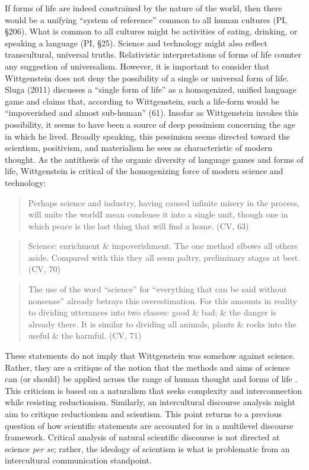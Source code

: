 If forms of life are indeed constrained by the nature of the world, then there would be a unifying ``system of reference'' common to all human cultures (PI, \S 206). What is common to all cultures might be activities of eating, drinking, or speaking a language (PI, \S 25). Science and technology might also reflect transcultural, universal truths. Relativistic interpretations of forms of life counter any suggestion of universalism. However, it is important to consider that Wittgenstein does not deny the possibility of a single or universal form of life. Sluga (2011) discusses a ``single form of life'' as a homogenized, unified language game and claims that, according to Wittgenstein, such a life-form would be ``impoverished and almost sub-human'' (61). Insofar as Wittgenstein invokes this possibility, it seems to have been a source of deep pessimism concerning the age in which he lived. Broadly speaking, this pessimism seems directed toward the scientism, positivism, and materialism he sees as characteristic of modern thought. As the antithesis of the organic diversity of language games and forms of life, Wittgenstein is critical of the homogenizing force of modern science and technology:

\begin{quote}
Perhaps science and industry, having caused infinite misery in the process, will unite the world\textemdash I mean condense it into a single unit, though one in which peace is the last thing that will find a home. (CV, 63)  
\end{quote}

\begin{quote}
Science: enrichment \& impoverishment. The one method elbows all others aside. Compared with this they all seem paltry, preliminary stages at best.  (CV, 70)  
\end{quote}

\begin{quote}
The use of the word ``science'' for ``everything that can be said without nonsense'' already betrays this overestimation. For this amounts in reality to dividing utterances into two classes: good \& bad; \& the danger is already there. It is similar to dividing all animals, plants \& rocks into the useful \& the harmful. (CV, 71) 
\end{quote}

These statements do not imply that Wittgenstein was somehow against science. Rather, they are a critique of the notion that the methods and aims of science can (or should) be applied across the range of human thought and forms of life \citep{Read2016}. This criticism is based on a naturalism that seeks complexity and interconnection while resisting reductionism. Similarly, an intercultural discourse analysis might aim to critique reductionism and scientism. This point returns to a previous question of how scientific statements are accounted for in a multilevel discourse framework. Critical analysis of natural scientific discourse is not directed at science \textit{per se}; rather, the ideology of scientism is what is problematic from an intercultural communication standpoint. 

